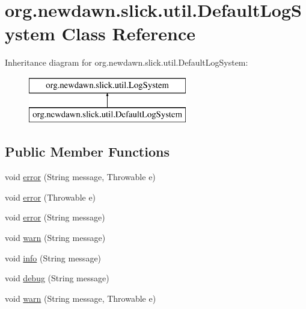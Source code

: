\hypertarget{classorg_1_1newdawn_1_1slick_1_1util_1_1_default_log_system}{}\section{org.\+newdawn.\+slick.\+util.\+Default\+Log\+System Class Reference}
\label{classorg_1_1newdawn_1_1slick_1_1util_1_1_default_log_system}
Inheritance diagram for org.\+newdawn.\+slick.\+util.\+Default\+Log\+System\+:\begin{figure}[H]
\begin{center}
\leavevmode
\includegraphics[height=2.000000cm]{classorg_1_1newdawn_1_1slick_1_1util_1_1_default_log_system}
\end{center}
\end{figure}
\subsection*{Public Member Functions}
\begin{DoxyCompactItemize}
\item 
void \mbox{\hyperlink{classorg_1_1newdawn_1_1slick_1_1util_1_1_default_log_system_a4ba3a42657c5f7ee2c55fa49dbe7a287}{error}} (String message, Throwable e)
\item 
void \mbox{\hyperlink{classorg_1_1newdawn_1_1slick_1_1util_1_1_default_log_system_a631253b42ce86ee0cbfdfc2df26008e8}{error}} (Throwable e)
\item 
void \mbox{\hyperlink{classorg_1_1newdawn_1_1slick_1_1util_1_1_default_log_system_ae28cce21f2c8a9aacd97f571fcb1b3c2}{error}} (String message)
\item 
void \mbox{\hyperlink{classorg_1_1newdawn_1_1slick_1_1util_1_1_default_log_system_a43bae56fa5d877bbdee7a413e3699f63}{warn}} (String message)
\item 
void \mbox{\hyperlink{classorg_1_1newdawn_1_1slick_1_1util_1_1_default_log_system_a07edffad8b8eb3bd937f82110621b761}{info}} (String message)
\item 
void \mbox{\hyperlink{classorg_1_1newdawn_1_1slick_1_1util_1_1_default_log_system_ac1498dd15e05ecbca4f376da7bbdaa25}{debug}} (String message)
\item 
void \mbox{\hyperlink{classorg_1_1newdawn_1_1slick_1_1util_1_1_default_log_system_ab630bdef457c3881ef3d8fdcedf6d8bf}{warn}} (String message, Throwable e)
\end{DoxyCompactItemize}
